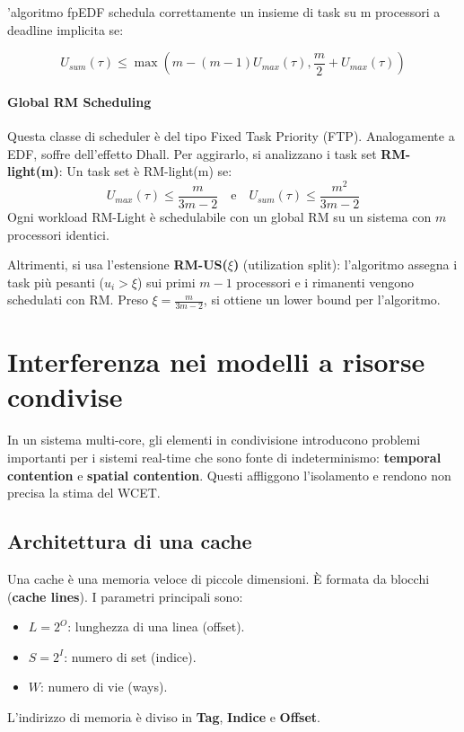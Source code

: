 \documentclass[11pt,a4paper]{report}
\begin{document}
'algoritmo fpEDF schedula correttamente un insieme di task su m processori a deadline implicita se:

\begin{equation}
    U_{sum}(\tau) \leq \max(m - (m - 1)U_{max}(\tau), \frac{m}{2} + U_{max}(\tau))
\end{equation}

\subsubsection{Global RM Scheduling}
Questa classe di scheduler è del tipo Fixed Task Priority (FTP). Analogamente a EDF, soffre dell'effetto Dhall. Per aggirarlo, si analizzano i task set \textbf{RM-light(m)}:
Un task set è RM-light(m) se:
\[ U_{max}(\tau) \le \frac{m}{3m-2} \quad \text{e} \quad U_{sum}(\tau) \le \frac{m^2}{3m-2} \]
Ogni workload RM-Light è schedulabile con un global RM su un sistema con $m$ processori identici.

Altrimenti, si usa l'estensione \textbf{RM-US($\xi$)} (utilization split): l'algoritmo assegna i task più pesanti ($u_i > \xi$) sui primi $m-1$ processori e i rimanenti vengono schedulati con RM. Preso $\xi = \frac{m}{3m-2}$, si ottiene un lower bound per l'algoritmo.

\chapter{Interferenza nei modelli a risorse condivise}

In un sistema multi-core, gli elementi in condivisione introducono problemi importanti per i sistemi real-time che sono fonte di indeterminismo: \textbf{temporal contention} e \textbf{spatial contention}. Questi affliggono l'isolamento e rendono non precisa la stima del WCET.

\section{Architettura di una cache}

Una cache è una memoria veloce di piccole dimensioni. È formata da blocchi (\textbf{cache lines}). I parametri principali sono:
\begin{itemize}
    \item $L = 2^O$: lunghezza di una linea (offset).
    \item $S = 2^I$: numero di set (indice).
    \item $W$: numero di vie (ways).
\end{itemize}
L'indirizzo di memoria è diviso in \textbf{Tag}, \textbf{Indice} e \textbf{Offset}.
\end{document}
